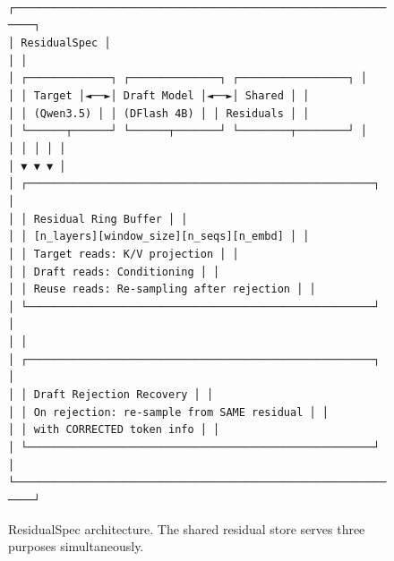 \documentclass[11pt]{article}
\begin{document}
\begin{figure}[h]
\centering
\begin{minipage}{0.95\textwidth}
\centering
\texttt{
┌──────────────────────────────────────────────────────────────┐\\
│                     ResidualSpec                             │\\
│                                                              │\\
│  ┌─────────────┐    ┌──────────────┐    ┌─────────────────┐ │\\
│  │  Target     │◄──►│  Draft Model │◄──►│   Shared        │ │\\
│  │  (Qwen3.5)  │    │  (DFlash 4B) │    │   Residuals     │ │\\
│  └──────┬──────┘    └──────┬───────┘    └────────┬────────┘ │\\
│         │                  │                     │           │\\
│         ▼                  ▼                     ▼           │\\
│  ┌──────────────────────────────────────────────────────┐   │\\
│  │              Residual Ring Buffer                    │   │\\
│  │  [n\_layers][window\_size][n\_seqs][n\_embd]        │   │\\
│  │  Target reads: K/V projection                        │   │\\
│  │  Draft reads:  Conditioning                          │   │\\
│  │  Reuse reads:  Re-sampling after rejection           │   │\\
│  └──────────────────────────────────────────────────────┘   │\\
│                                                              │\\
│  ┌──────────────────────────────────────────────────────┐   │\\
│  │              Draft Rejection Recovery                │   │\\
│  │  On rejection: re-sample from SAME residual          │   │\\
│  │               with CORRECTED token info              │   │\\
│  └──────────────────────────────────────────────────────┘   │\\
└──────────────────────────────────────────────────────────────┘
}
\end{minipage}
\caption{ResidualSpec architecture. The shared residual store serves three purposes simultaneously.}
\label{fig:architecture}
\end{figure}
\end{document}

